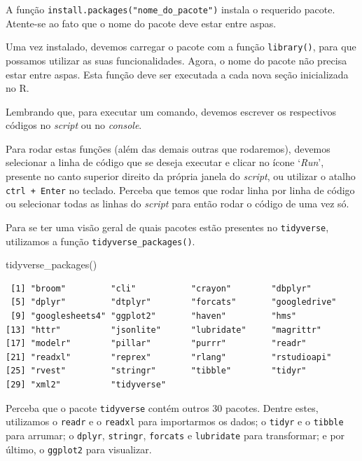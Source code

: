 \documentclass[
  brazilian,
]{book}
\newenvironment{Shaded}{\begin{snugshade}}{\end{snugshade}}
\newcommand{\FunctionTok}[1]{\textcolor[rgb]{0.00,0.00,0.00}{#1}}
\newcommand{\NormalTok}[1]{#1}
\begin{document}
A função \texttt{install.packages("nome\_do\_pacote")} instala o requerido pacote. Atente-se ao fato que o nome do pacote deve estar entre aspas.

Uma vez instalado, devemos carregar o pacote com a função \texttt{library()}, para que possamos utilizar as suas funcionalidades. Agora, o nome do pacote não precisa estar entre aspas. Esta função deve ser executada a cada nova seção inicializada no R.

Lembrando que, para executar um comando, devemos escrever os respectivos códigos no \emph{script} ou no \emph{console}.

Para rodar estas funções (além das demais outras que rodaremos), devemos selecionar a linha de código que se deseja executar e clicar no ícone `\emph{Run}', presente no canto superior direito da própria janela do \emph{script}, ou utilizar o atalho \texttt{ctrl\ +\ Enter} no teclado. Perceba que temos que rodar linha por linha de código ou selecionar todas as linhas do \emph{script} para então rodar o código de uma vez só.

Para se ter uma visão geral de quais pacotes estão presentes no \texttt{tidyverse}, utilizamos a função \texttt{tidyverse\_packages()}.

\begin{Shaded}
\begin{Highlighting}[]
\FunctionTok{tidyverse\_packages}\NormalTok{()}
\end{Highlighting}
\end{Shaded}

\begin{verbatim}
 [1] "broom"         "cli"           "crayon"        "dbplyr"       
 [5] "dplyr"         "dtplyr"        "forcats"       "googledrive"  
 [9] "googlesheets4" "ggplot2"       "haven"         "hms"          
[13] "httr"          "jsonlite"      "lubridate"     "magrittr"     
[17] "modelr"        "pillar"        "purrr"         "readr"        
[21] "readxl"        "reprex"        "rlang"         "rstudioapi"   
[25] "rvest"         "stringr"       "tibble"        "tidyr"        
[29] "xml2"          "tidyverse"    
\end{verbatim}

Perceba que o pacote \texttt{tidyverse} contém outros 30 pacotes. Dentre estes, utilizamos o \texttt{readr} e o \texttt{readxl} para importarmos os dados; o \texttt{tidyr} e o \texttt{tibble} para arrumar; o \texttt{dplyr}, \texttt{stringr}, \texttt{forcats} e \texttt{lubridate} para transformar; e por último, o \texttt{ggplot2} para visualizar.
\end{document}
